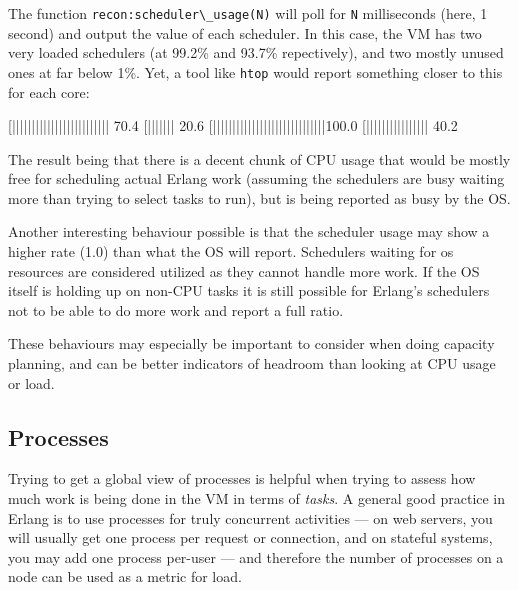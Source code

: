 \documentclass[11pt, oneside]{book}   	%
\newcommand{\app}[1]{\Verb`#1`}
\newcommand{\function}[1]{\Verb`#1`}
\newcommand{\var}[1]{\Verb`#1`}
\begin{document}
The function \function{recon:scheduler\_usage(N)} will poll for \var{N} milliseconds (here, 1 second) and output the value of each scheduler. In this case, the VM has two very loaded schedulers (at 99.2\% and 93.7\% repectively), and two mostly unused ones at far below 1\%. Yet, a tool like \app{htop} would report something closer to this for each core:

\begin{VerbatimText}
[|||||||||||||||||||||||||     70.4%
[|||||||                       20.6%
[|||||||||||||||||||||||||||||100.0%
[||||||||||||||||              40.2%
\end{VerbatimText}

The result being that there is a decent chunk of CPU usage that would be mostly free for scheduling actual Erlang work (assuming the schedulers are busy waiting more than trying to select tasks to run), but is being reported as busy by the OS.

Another interesting behaviour possible is that the scheduler usage may show a higher rate (1.0) than what the OS will report. Schedulers waiting for os resources are considered utilized as they cannot handle more work. If the OS itself is holding up on non-CPU tasks it is still possible for Erlang's schedulers not to be able to do more work and report a full ratio.

These behaviours may especially be important to consider when doing capacity planning, and can be better indicators of headroom than looking at CPU usage or load.


\subsection{Processes}
\label{subsec:global-procs}

Trying to get a global view of processes is helpful when trying to assess how much work is being done in the VM in terms of \emph{tasks}. A general good practice in Erlang is to use processes for truly concurrent activities — on web servers, you will usually get one process per request or connection, and on stateful systems, you may add one process per-user — and therefore the number of processes on a node can be used as a metric for load.
\end{document}
